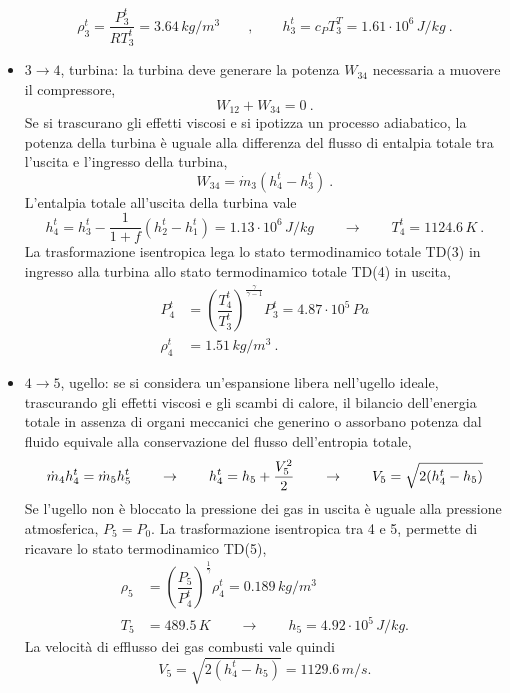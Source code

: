 \begin{itemize}
\begin{equation}
 \rho_3^t = \dfrac{P_3^t}{R T_3^t} = 3.64 \, kg/m^3 \qquad , \qquad h_3^t = c_P T_3^T = 1.61 \cdot 10^6 \, J/kg \ .
\end{equation}
 \item $3 \rightarrow 4$, turbina: la turbina deve generare la potenza $W_{34}$ necessaria a muovere il compressore,
\begin{equation}
  W_{12} + W_{34} = 0 \ .
\end{equation}
 Se si trascurano gli effetti viscosi e si ipotizza un processo adiabatico, la potenza della turbina è uguale alla differenza del flusso di entalpia totale tra l'uscita e l'ingresso della turbina,
\begin{equation}
 W_{34} = \dot{m}_3 ( h_4^t - h_3^t ) \ .
\end{equation}
L'entalpia totale all'uscita della turbina vale
\begin{equation}
  h_4^t = h_3^t - \dfrac{1}{1+f} ( h_2^t - h_1^t ) = 1.13 \cdot 10^6 \, J/kg 
\qquad \rightarrow \qquad T_4^t = 1124.6 \, K \ .
\end{equation}
La trasformazione isentropica lega lo stato termodinamico totale TD(3) in ingresso alla turbina allo stato termodinamico totale TD(4) in uscita,
\begin{equation}
\begin{aligned}
 P_4^t & = \left(\dfrac{T_4^t}{T_3^t} \right)^{\frac{\gamma}{\gamma-1}} P_3^t = 4.87 \cdot 10^5 \, Pa \\
 \rho_4^t & = 1.51 \, kg/m^3 \ .
\end{aligned}
\end{equation}
 \item $4 \rightarrow 5$, ugello: se si considera un'espansione libera nell'ugello ideale, trascurando gli effetti viscosi e gli scambi di calore, il bilancio dell'energia totale in assenza di organi meccanici che generino o assorbano potenza dal fluido equivale alla conservazione del flusso dell'entropia totale,
\begin{equation}
 \dot{m}_4 h_4^t = \dot{m}_5 h_5^t \qquad \rightarrow \qquad h_4^t = h_5 + \dfrac{V_5^2}{2} 
 \qquad \rightarrow \qquad V_5 = \sqrt{2(h_4^t - h_5)} \\
\end{equation}
Se l'ugello non è bloccato la pressione dei gas in uscita è uguale alla pressione atmosferica, $P_5 = P_0$.
La trasformazione isentropica tra 4 e 5, permette di ricavare lo stato termodinamico TD(5),
\begin{equation}
\begin{aligned}
  \rho_5 & = \left( \dfrac{P_5}{P_4^t} \right)^{\frac{1}{\gamma}} \rho_4^t = 0.189 \, kg/m^3 \\
     T_5 & = 489.5 \, K \qquad \rightarrow \qquad h_5 = 4.92 \cdot 10^5 \, J/kg .
\end{aligned}
\end{equation}
La velocità di efflusso dei gas combusti vale quindi
\begin{equation}
 V_5 = \sqrt{2(h_4^t - h_5)} = 1129.6 \, m/s .
\end{equation}
\end{itemize}
